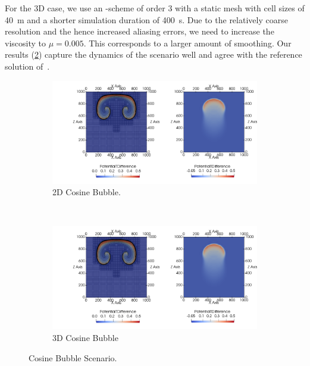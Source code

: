 \documentclass[runningheads]{llncs}
\begin{document}
For the 3D case, we use an \aderdg{}-scheme of order 3 with a static mesh with cell sizes of \SI{40}{\m} and a shorter simulation duration of \SI{400}{\s}.
Due to the relatively coarse resolution and the hence increased aliasing errors, we need to increase the viscosity to $\mu = 0.005$.
This corresponds to a larger amount of smoothing.
Our results (\cref{fig:cosine-3d}) capture the dynamics of the scenario well and agree with the reference solution of~\cite{kelly2012continuous}.

\begin{figure}[tb]
  \centering
  \begin{subfigure}[t]{0.5\textwidth}
    \centering
    \includegraphics[scale=0.16, trim={0cm 0 32cm 0},clip]{paper_cosine_bubble_collage}
    \caption{\label{fig:cosine-2d}2D Cosine Bubble.}%
  \end{subfigure}~%
  \begin{subfigure}[t]{0.5\textwidth}
    \centering
    \includegraphics[scale=0.16, trim={42cm 0 0cm 0},clip]{paper_cosine_bubble_collage}
    \caption{\label{fig:cosine-3d}3D Cosine Bubble}
  \end{subfigure}
  \caption{\label{fig:cosine-bubbles-results}Cosine Bubble Scenario.}
\end{figure}
\end{document}
